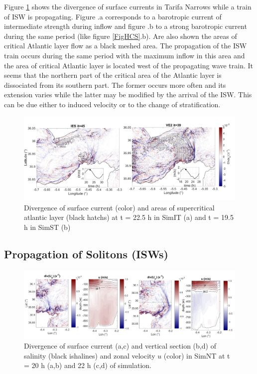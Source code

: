 Figure \ref{FigISWGBR3D} shows \color{blue} the divergence of surface currents in Tarifa Narrows while a train of ISW is propagating. Figure .a corresponds to a barotropic current of intermediate strength during inflow and figure .b to a strong barotropic current during the same period (like figure \ref{FigHCS}.b). \color{black} Are also shown the areas of critical Atlantic layer flow as a black meshed area. The propagation of the ISW train occurs \color{blue} during the same period with the maximum inflow in this area and the area of critical Atlantic layer is located \color{black} west of the propagating wave train. It seems that the northern part of the critical area of the Atlantic layer is dissociated from its southern part. The former occurs more often and its extension varies while the latter may be modified by the arrival of the ISW. This can be due either to induced velocity or to the change of stratification. \color{black}



\begin{figure}[!h]
 \centering
\includegraphics[width=\linewidth]{./GBR3D/FigWaveCont.png}
 \caption {Divergence of surface current (color) and areas of supercritical atlantic layer (black hatchs) at t = 22.5 h in SimIT (a) and t = 19.5 h in SimST (b)}
 \label{FigISWGBR3D}
\end{figure}

\subsection{Propagation of Solitons (ISWs)}

\begin{figure}[!h]
 \centering
 \includegraphics[width=1.\textwidth]{./GBR3D/coupesISW_ME2-2.png}
 \caption {Divergence of surface current (a,c) and vertical section (b,d) of salinity (black ishalines) and zonal velocity $u$ (color) in SimNT at t = 20 h (a,b) and 22 h (c,d) of simulation.}
  \label{FigISWNT}
\end{figure}



